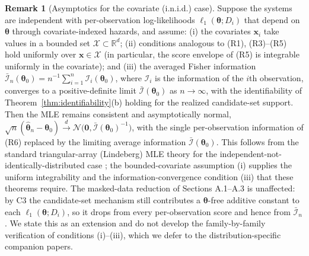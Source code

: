 \documentclass[11pt]{article}
\theoremstyle{definition}
\newtheorem{remark}{Remark}
\theoremstyle{plain}
\renewcommand{\v}[1]{\boldsymbol{#1}}
\begin{document}
\begin{remark}[Asymptotics for the covariate (i.n.i.d.) case]
\label{rem:inid-asymptotics}
Suppose the systems are independent with per-observation
log-likelihoods $\ell_1(\v{\theta}; D_i)$ that depend on $\v{\theta}$
through covariate-indexed hazards, and assume:
(i) the covariates $\v{x}_i$ take values in a bounded set
$\mathcal{X} \subset \mathbb{R}^d$;
(ii) conditions analogous to (R1), (R3)--(R5) hold uniformly over
$\v{x} \in \mathcal{X}$ (in particular, the score envelope of (R5)
is integrable uniformly in the covariate);
and (iii) the averaged Fisher information
$\bar{\mathcal{I}}_n(\v{\theta}_0) = n^{-1} \sum_{i=1}^n
\mathcal{I}_i(\v{\theta}_0)$, where $\mathcal{I}_i$ is the
information of the $i$th observation, converges to a positive-definite
limit $\bar{\mathcal{I}}(\v{\theta}_0)$ as $n \to \infty$, with the
identifiability of Theorem~\ref{thm:identifiability}(b) holding for
the realized candidate-set support.
Then the MLE remains consistent and asymptotically normal,
$\sqrt{n}(\hat{\v{\theta}}_n - \v{\theta}_0) \xrightarrow{d}
\mathcal{N}\!\bigl(\v{0}, \bar{\mathcal{I}}(\v{\theta}_0)^{-1}\bigr)$,
with the single per-observation information of (R6) replaced by the
limiting average information $\bar{\mathcal{I}}(\v{\theta}_0)$.
This follows from the standard triangular-array (Lindeberg) MLE
theory for the independent-not-identically-distributed case
\citep{hoadley1971,vandervaart1998asymptotic}; the bounded-covariate
assumption (i) supplies the uniform integrability and the
information-convergence condition (iii) that these theorems require.
The masked-data reduction of Sections A.1--A.3 is unaffected: by C3
the candidate-set mechanism still contributes a $\v{\theta}$-free
additive constant to each $\ell_1(\v{\theta}; D_i)$, so it drops from
every per-observation score and hence from $\bar{\mathcal{I}}_n$.
We state this as an extension and do not develop the family-by-family
verification of conditions (i)--(iii), which we defer to the
distribution-specific companion papers.
\end{remark}



\end{document}
